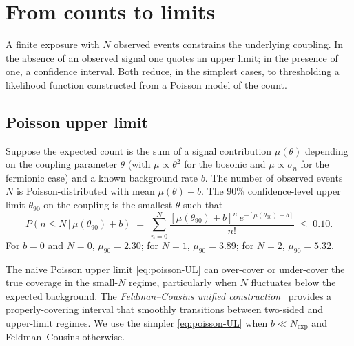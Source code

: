 \section{From counts to limits}
\label{sec:limits}

\begin{phenomenon}
A finite exposure with $N$ observed events constrains the
underlying coupling. In the absence of an observed signal one
quotes an upper limit; in the presence of one, a confidence
interval. Both reduce, in the simplest cases, to thresholding a
likelihood function constructed from a Poisson model of the count.
\end{phenomenon}

\subsection{Poisson upper limit}
\label{sec:poisson-limit}

\begin{statement}
\label{stmt:poisson-UL}
Suppose the expected count is the sum of a signal contribution
$\mu(\theta)$ depending on the coupling parameter $\theta$ (with
$\mu\propto\theta^2$ for the bosonic and $\mu\propto\sigma_n$ for
the fermionic case) and a known background rate $b$. The number of
observed events $N$ is Poisson-distributed with mean
$\mu(\theta)+b$. The 90\% confidence-level upper limit
$\theta_{90}$ on the coupling is the smallest $\theta$ such that
\begin{equation}
\label{eq:poisson-UL}
P(n\leq N \,|\,\mu(\theta_{90})+b)
\;=\;\sum_{n=0}^{N}\frac{[\mu(\theta_{90})+b]^n\,e^{-[\mu(\theta_{90})+b]}}{n!}
\;\leq\; 0.10.
\end{equation}
For $b=0$ and $N=0$, $\mu_{90}=2.30$; for $N=1$, $\mu_{90}=3.89$;
for $N=2$, $\mu_{90}=5.32$.
\end{statement}

\begin{remark}
The naive Poisson upper limit \cref{eq:poisson-UL} can over-cover
or under-cover the true coverage in the small-$N$ regime,
particularly when $N$ fluctuates below the expected background. The
\emph{Feldman--Cousins unified construction}~\cite{feldman1998}
provides a properly-covering interval that smoothly transitions
between two-sided and upper-limit regimes. We use the simpler
\cref{eq:poisson-UL} when $b\ll N_\text{exp}$ and Feldman--Cousins
otherwise.
\end{remark}

